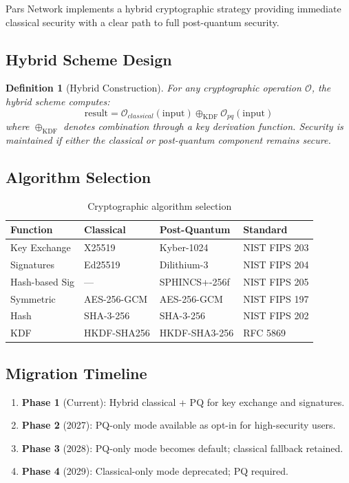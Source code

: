 \documentclass[11pt,a4paper]{article}
\newtheorem{definition}{Definition}
\begin{document}
Pars Network implements a hybrid cryptographic strategy providing immediate classical security with a clear path to full post-quantum security.

\subsection{Hybrid Scheme Design}

\begin{definition}[Hybrid Construction]
For any cryptographic operation $\mathcal{O}$, the hybrid scheme computes:
\[
\text{result} = \mathcal{O}_{classical}(\text{input}) \oplus_{\text{KDF}} \mathcal{O}_{pq}(\text{input})
\]
where $\oplus_{\text{KDF}}$ denotes combination through a key derivation function. Security is maintained if \emph{either} the classical or post-quantum component remains secure.
\end{definition}

\subsection{Algorithm Selection}

\begin{table}[H]
\centering
\caption{Cryptographic algorithm selection}
\label{tab:crypto}
\begin{tabularx}{\textwidth}{lllX}
\toprule
\textbf{Function} & \textbf{Classical} & \textbf{Post-Quantum} & \textbf{Standard} \\
\midrule
Key Exchange & X25519 & Kyber-1024 & NIST FIPS 203 \\
Signatures & Ed25519 & Dilithium-3 & NIST FIPS 204 \\
Hash-based Sig & --- & SPHINCS+-256f & NIST FIPS 205 \\
Symmetric & AES-256-GCM & AES-256-GCM & NIST FIPS 197 \\
Hash & SHA-3-256 & SHA-3-256 & NIST FIPS 202 \\
KDF & HKDF-SHA256 & HKDF-SHA3-256 & RFC 5869 \\
\bottomrule
\end{tabularx}
\end{table}

\subsection{Migration Timeline}

\begin{enumerate}
    \item \textbf{Phase 1} (Current): Hybrid classical + PQ for key exchange and signatures.
    \item \textbf{Phase 2} (2027): PQ-only mode available as opt-in for high-security users.
    \item \textbf{Phase 3} (2028): PQ-only mode becomes default; classical fallback retained.
    \item \textbf{Phase 4} (2029): Classical-only mode deprecated; PQ required.
\end{enumerate}
\end{document}
